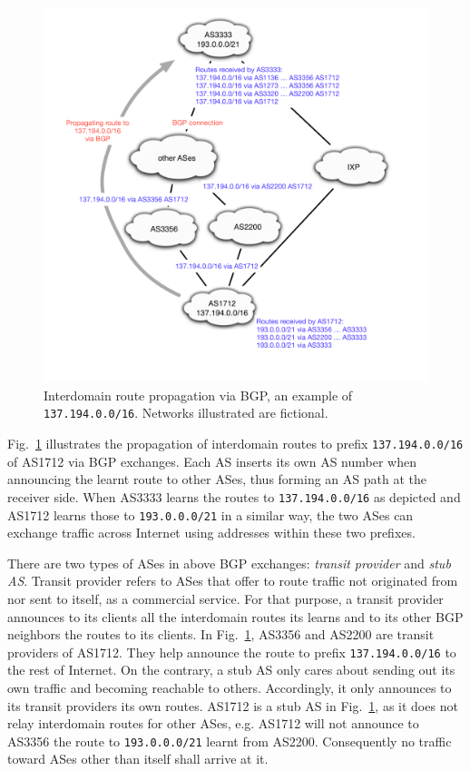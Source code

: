 \begin{figure}[!htb]
\centering
\includegraphics[width=1.1\textwidth]{gfx/chap1/bgp_route_propagation.pdf}
\caption{Interdomain route propagation via \ac{BGP}, an example of \texttt{137.194.0.0/16}. Networks illustrated are fictional.}
\label{fig:bgp_propa}
\end{figure}

Fig.~\ref{fig:bgp_propa} illustrates the propagation of interdomain routes to prefix \texttt{137.194.0.0/16} of AS1712 via BGP exchanges. Each AS inserts its own AS number when announcing the learnt route to other ASes, thus forming an AS path at the receiver side. When AS3333 learns the routes to \texttt{137.194.0.0/16} as depicted and AS1712 learns those to \texttt{193.0.0.0/21} in a similar way, the two ASes can exchange traffic across Internet using addresses within these two prefixes.

There are two types of ASes in above BGP exchanges: \textit{transit provider} and \textit{stub AS}.
Transit provider refers to ASes that offer to route traffic not originated from nor sent to itself, as a commercial service.
For that purpose, a transit provider announces to its clients all the interdomain routes its learns and to its other BGP neighbors the routes to its clients.
In Fig.~\ref{fig:bgp_propa}, AS3356 and AS2200 are transit providers of AS1712. They help announce the route to prefix \texttt{137.194.0.0/16}
to the rest of Internet.
On the contrary, a stub AS only cares about sending out its own traffic and becoming reachable to others.
Accordingly, it only announces to its transit providers its own routes. AS1712 is a stub AS in Fig.~\ref{fig:bgp_propa}, as it does not relay interdomain routes for other ASes, e.g. AS1712 will not announce to AS3356 the route to \texttt{193.0.0.0/21} learnt from AS2200. Consequently no traffic toward ASes other than itself shall arrive at it.

